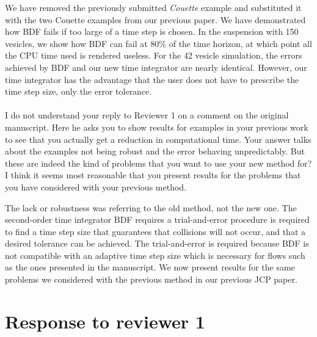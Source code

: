 \documentclass[12pt]{article}
\newcommand{\comment}[1]{{\color{blue} #1}}
\begin{document}
We have removed the previously submitted {\em Couette} example and
substituted it with the two Couette examples from our previous paper.
We have demonstrated how BDF fails if too large of a time step is
chosen.  In the suspension with 150 vesicles, we show how BDF can fail
at 80\% of the time horizon, at which point all the CPU time used is
rendered useless.  For the 42 vesicle simulation, the errors achieved by
BDF and our new time integrator are nearly identical.  However, our time
integrator has the advantage that the user does not have to prescribe
the time step size, only the error tolerance. 
\\ \\
\comment{I do not understand your reply to Reviewer 1 on a comment on
the original manuscript. Here he asks you to show results for examples
in your previous work to see that you actually get a reduction in
computational time. Your answer talks about the examples not being
robust and the error behaving unpredictably. But these are indeed the
kind of problems that you want to use your new method for? I think it
seems most reasonable that you present results for the problems that you
have considered with your previous method.}

The lack or robustness was referring to the old method, not the new
one. The second-order time integrator BDF requires a trial-and-error
procedure is required to find a time step size that guarantees that
collisions will not occur, and that a desired tolerance can be
achieved. The trial-and-error is required because BDF is not compatible
with an adaptive time step size which is necessary for flows such as
the ones presented in the manuscript. We now present results for the
same problems we considered with the previous method in our previous
JCP paper.


\section*{Response to reviewer 1}
\end{document}
